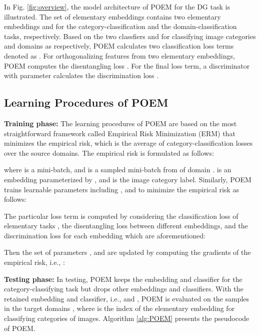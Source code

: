 \documentclass[letterpaper]{article} \usepackage{aaai23}  \usepackage{times}  \usepackage{helvet}  \usepackage{courier}  \usepackage[hyphens]{url}  \usepackage{graphicx} \urlstyle{rm} \def\UrlFont{\rm}  \usepackage{natbib}  \usepackage{caption} \frenchspacing  \setlength{\pdfpagewidth}{8.5in}  \setlength{\pdfpageheight}{11in}  \usepackage[labelsep=period]{caption}
\begin{document}
In Fig. \ref{fig:overview}, the model architecture of POEM for the DG task is illustrated. The set of elementary embeddings contains two elementary embeddings  and  for the category-classification and the domain-classification tasks, respectively. Based on the two classfiers  and  for classifying image categories and domains as respectively, POEM calculates two classification loss terms denoted as . For orthogonalizing features from two elementary embeddings, POEM computes the disentangling loss . For the final loss term, a discriminator with parameter  calculates the discrimination loss . 


\subsection{Learning Procedures of POEM}
\textbf{Training phase:}
The learning procedures of POEM are based on the most straightforward framework called Empirical Risk Minimization (ERM) \cite{ERM,Domainbed} that minimizes the empirical risk, which is the average of category-classification losses  over the source domains.
The empirical risk is formulated as follows:

where  is a mini-batch, and  is a sampled mini-batch from   of domain .  is an embedding parameterized by , and  is the image category label.
Similarly, POEM trains learnable parameters including ,  and  to minimize the empirical risk as follows:

The particular loss term  is computed by considering the classification loss of elementary tasks , the disentangling loss  between different embeddings, and the discrimination loss  for each embedding which are aforementioned:

Then the set of parameters ,  and  are updated by computing the gradients of the empirical risk, i.e., :


\textbf{Testing phase:}
In testing, POEM keeps the embedding and classifier for the category-classifying task but drops other embeddings and classifiers. 
With the retained embedding and classifier, i.e.,  and , POEM is evaluated on the samples in the target domains , where  is the index of the elementary embedding for classifying categories of images.
Algorithm \ref{alg:POEM} presents the pseudocode of POEM.
\end{document}
